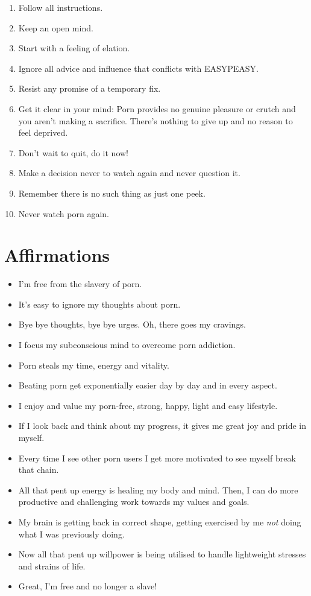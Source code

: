 \documentclass[easypeasy.tex]{subfiles}
\begin{document}
\begin{enumerate}
\item Follow all instructions.
\item Keep an open mind.
\item Start with a feeling of elation.
\item Ignore all advice and influence that conflicts with EASYPEASY.
\item Resist any promise of a temporary fix.
\item Get it clear in your mind: Porn provides no genuine pleasure or crutch and you aren't making a sacrifice. There's nothing to give up and no reason to feel deprived.
\item Don't wait to quit, do it now!
\item Make a decision never to watch again and never question it.
\item Remember there is no such thing as just one peek.
\item Never watch porn again.
\end{enumerate}

\section{Affirmations}

\begin{itemize}
\item I'm free from the slavery of porn.
\item It's easy to ignore my thoughts about porn.
\item Bye bye thoughts, bye bye urges. Oh, there goes my cravings.
\item I focus my subconscious mind to overcome porn addiction.
\item Porn steals my time, energy and vitality.
\item Beating porn get exponentially easier day by day and in every aspect.
\item I enjoy and value my porn-free, strong, happy, light and easy lifestyle.
\item If I look back and think about my progress, it gives me great joy and pride in myself.
\item Every time I see other porn users I get more motivated to see myself break that chain.
\item All that pent up energy is healing my body and mind. Then, I can do more productive and challenging work towards my values and goals.
\item My brain is getting back in correct shape, getting exercised by me \textit{not} doing what I was previously doing.
\item Now all that pent up willpower is being utilised to handle lightweight stresses and strains of life.
\item Great, I'm free and no longer a slave!
\end{itemize}
\end{document}
